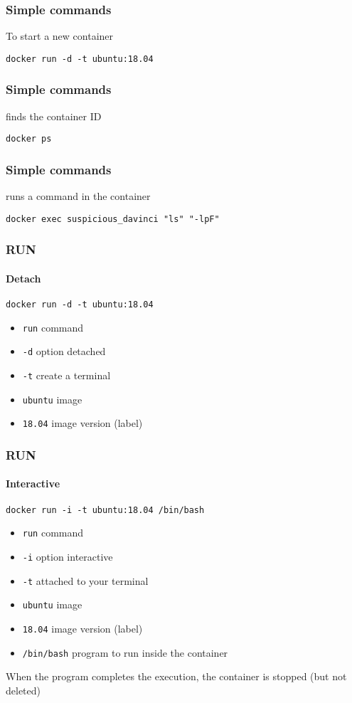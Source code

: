 
\begin{frame}[fragile]
\frametitle{Simple commands}

To start a new container

\begin{lstlisting}
docker run -d -t ubuntu:18.04
\end{lstlisting}

\end{frame}

\begin{frame}[fragile]
\frametitle{Simple commands}

finds the container ID

\begin{lstlisting}
docker ps
\end{lstlisting}

\end{frame}

\begin{frame}[fragile]
\frametitle{Simple commands}

runs a command in the container
\begin{lstlisting}
docker exec suspicious_davinci "ls" "-lpF"
\end{lstlisting}
\end{frame}


\begin{frame}[fragile]
\frametitle{RUN}
\framesubtitle{Detach}
\begin{lstlisting}
docker run -d -t ubuntu:18.04
\end{lstlisting}

\begin{itemize}
\item \lstinline!run! command
\item \lstinline!-d! option detached
\item \lstinline!-t! create a terminal
\item \lstinline!ubuntu! image
\item \lstinline!18.04! image version (label)
\end{itemize}
\end{frame}


\begin{frame}[fragile]
\frametitle{RUN}
\framesubtitle{Interactive}
\begin{lstlisting}
docker run -i -t ubuntu:18.04 /bin/bash
\end{lstlisting}

\begin{itemize}
\item \lstinline!run! command
\item \lstinline!-i! option interactive
\item \lstinline!-t! attached to your terminal
\item \lstinline!ubuntu! image
\item \lstinline!18.04! image version (label)
\item \lstinline!/bin/bash! program to run inside the container
\end{itemize}

When the program completes the execution, the container is stopped (but not deleted)
\end{frame}

